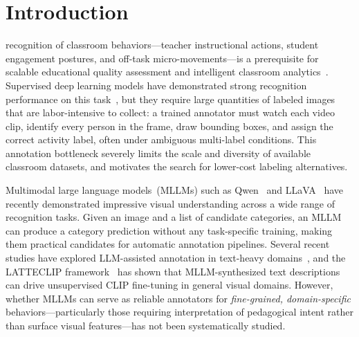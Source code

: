 \documentclass{ieeeaccess}
\begin{document}
\titlepgskip=-15pt

\maketitle

\section{Introduction}
\label{sec:intro}

 recognition of classroom behaviors---teacher instructional
actions, student engagement postures, and off-task micro-movements---is
a prerequisite for scalable educational quality assessment and
intelligent classroom analytics~\cite{brophy2000teaching,anderson2004classroom}.
Supervised deep learning models have demonstrated strong recognition
performance on this task~\cite{li2022classroom_transformer,zhang2020classroom_cnn},
but they require large quantities of labeled images that are
labor-intensive to collect: a trained annotator must watch each video
clip, identify every person in the frame, draw bounding boxes, and
assign the correct activity label, often under ambiguous multi-label
conditions.
This annotation bottleneck severely limits the scale and diversity of
available classroom datasets, and motivates the search for
lower-cost labeling alternatives.

Multimodal large language models~(MLLMs) such as
Qwen~\cite{bai2023qwen} and LLaVA~\cite{liu2023llava}
have recently demonstrated impressive visual understanding across a
wide range of recognition tasks.
Given an image and a list of candidate categories, an MLLM can produce
a category prediction without any task-specific training, making them
practical candidates for automatic annotation pipelines.
Several recent studies have explored LLM-assisted annotation in
text-heavy domains~\cite{gilardi2023chatgpt,he2023annollm}, and
the LATTECLIP framework~\cite{cao2025latteclip} has shown that
MLLM-synthesized text descriptions can drive unsupervised CLIP
fine-tuning in general visual domains.
However, whether MLLMs can serve as reliable annotators for
\emph{fine-grained, domain-specific} behaviors---particularly those
requiring interpretation of pedagogical intent rather than surface
visual features---has not been systematically studied.
\end{document}
